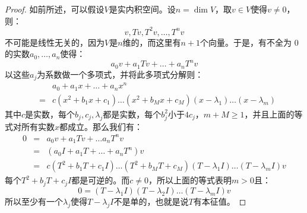 \documentclass[10pt,a4paper,UTF8]{article}
\begin{document}
\begin{proof}
如前所述，可以假设\(V\)是实内积空间。设\(n=\dim V\)，取\(v\in V\)使得\(v\neq 0\)，则：
\begin{equation}
\label{eq:8}
v,Tv,T^{2}v,\ldots ,T^{n}v
\end{equation}
不可能是线性无关的，因为\(V\)是\(n\)维的，而这里有\(n+1\)个向量。于是，有不全为 0 的实数\(a_{0},\ldots ,a_{n}\)使得：
\begin{equation}
\label{eq:9}
a_{0}v + a_{1}Tv + \ldots + a_{n}T^{n}v
\end{equation}
以这些\(a_{j}\)为系数做一个多项式，并将此多项式分解则：
\begin{eqnarray*}
& &a_{0} + a_{1}x + \ldots + a_{n}x^{n} \\
&=&c(x^{2} + b_{1}x +c_{1}) \ldots (x^{2}+b_{M}x+c_{M})(x-\lambda_{1})\ldots (x-\lambda_{m})
\end{eqnarray*}
其中\(c\)是实数，每个\(b_{j},c_{j},\lambda_{j}\)都是实数，每个\(b_{j}^{2}\)小于\(4c_{j}\)，\(m+M \geq 1\)，并且上面的等式对所有实数\(x\)都成立。那么我们有：
\begin{eqnarray*}
0&=& a_{0}v + a_{1}Tv + \ldots a_{n}T^{n}v \\
&=& (a_{0}I + a_{1}T + \ldots + a_{n}T^{n})v \\
&=& c(T^{2} + b_{1}T + c_{1}I)\ldots (T^{2} + b_{M}T +c_{M})(T-\lambda_{1}I)\ldots (T-\lambda_{m}I)v
\end{eqnarray*}
每个\(T^{2}+b_{j}T+c_{j}I\)都是可逆的。而\(c\neq 0\)，所以上面的等式表明\(m > 0\)且：
\begin{equation}
\label{eq:11}
0 = (T-\lambda_{1}I)(T-\lambda_{2}I)\ldots (T-\lambda_{m}I)v
\end{equation}
所以至少有一个\(\lambda_{j}\)使得\(T-\lambda_{j}I\)不是单的，也就是说\(T\)有本征值。
\end{proof}
\end{document}
